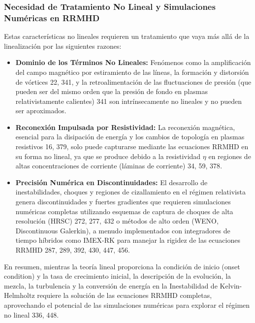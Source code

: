\subsubsection{Necesidad de Tratamiento No Lineal y Simulaciones Numéricas en RRMHD}

Estas características no lineales requieren un tratamiento que vaya más allá de la linealización por las siguientes razones:

\begin{itemize}
    \item \textbf{Dominio de los Términos No Lineales:} Fenómenos como la amplificación del campo magnético por estiramiento de las líneas, la formación y distorsión de vórtices {22, 341}, y la retroalimentación de las fluctuaciones de presión (que pueden ser del mismo orden que la presión de fondo en plasmas relativistamente calientes) {341} son intrínsecamente no lineales y no pueden ser aproximados.
    \item \textbf{Reconexión Impulsada por Resistividad:} La reconexión magnética, esencial para la disipación de energía y los cambios de topología en plasmas resistivos {16, 379}, solo puede capturarse mediante las ecuaciones RRMHD en su forma no lineal, ya que se produce debido a la resistividad $\eta$ en regiones de altas concentraciones de corriente (láminas de corriente) {34, 59, 378}.
    \item \textbf{Precisión Numérica en Discontinuidades:} El desarrollo de inestabilidades, choques y regiones de cizallamiento en el régimen relativista genera discontinuidades y fuertes gradientes que requieren simulaciones numéricas completas utilizando esquemas de captura de choques de alta resolución (HRSC) {272, 277, 432} o métodos de alto orden (WENO, Discontinuous Galerkin), a menudo implementados con integradores de tiempo híbridos como IMEX-RK para manejar la rigidez de las ecuaciones RRMHD {287, 289, 392, 430, 447, 456}.
\end{itemize}

En resumen, mientras la teoría lineal proporciona la condición de inicio (onset condition) y la tasa de crecimiento inicial, la descripción de la evolución, la mezcla, la turbulencia y la conversión de energía en la Inestabilidad de Kelvin-Helmholtz requiere la solución de las ecuaciones RRMHD completas, aprovechando el potencial de las simulaciones numéricas para explorar el régimen no lineal {336, 448}.
